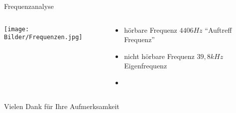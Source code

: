 \documentclass[12pt]{beamer}
\begin{document}
\begin{frame}{Frequenzanalyse}
\begin{columns}
\begin{column}{.6\textwidth}
\texttt{[image: Bilder/Frequenzen.jpg]}
\end{column}
\begin{column}{.4\textwidth}
\begin{itemize}
\item<2-> hörbare Frequenz $4406Hz$ "`Auftreff Frequenz"'
\item<3-> nicht hörbare Frequenz $39,8kHz$ Eigenfrequenz
\item[ ] \ 
\end{itemize}
\end{column}
\end{columns}
\end{frame}

\begin{frame}
\center
{\HUGE Vielen Dank für Ihre Aufmerksamkeit}
\end{frame}
\end{document}
